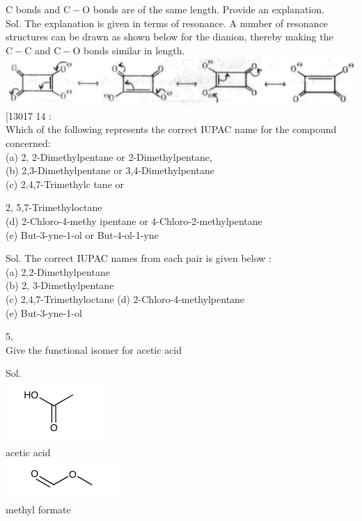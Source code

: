 \documentclass[10pt]{article}
\begin{document}
C bonds and $\mathrm{C}-\mathrm{O}$ bonds are of the same length. Provide an explanation.\\
Sol. The explanation is given in terms of resonance. A number of resonance structures can be drawn as shown below for the dianion, thereby making the $\mathrm{C}-\mathrm{C}$ and $\mathrm{C}-\mathrm{O}$ bonds similar in length.\\
\includegraphics[max width=\textwidth, center]{2025_01_28_8470952b98110cec3aabg-119(2)}\\[0pt]
[13017 14 :\\
Which of the following represents the correct IUPAC name for the compound concerned:\\
(a) 2, 2-Dimethylpentane or 2-Dimethylpentane,\\
(b) 2,3-Dimethylpentane or 3,4-Dimethylpentane\\
(c) 2,4,7-Trimethylc tane or

2, 5,7-Trimethyloctane\\
(d) 2-Chloro-4-methy ipentane or 4-Chloro-2-methylpentane\\
(e) But-3-yne-1-ol or But-4-ol-1-yne

Sol. The correct IUPAC names from each pair is given below :\\
(a) 2,2-Dimethylpentane\\
(b) 2, 3-Dimethylpentane\\
(c) 2,4,7-Trimethyloctane (d) 2-Chloro-4-methylpentane\\
(e) But-3-yne-1-ol

5,\\
Give the functional isomer for acetic acid

Sol.\\
\includegraphics{smile-77d08622e1f194b603706b0138d0873dd084322b}\\
acetic acid\\
\includegraphics{smile-6d9ee3e0ea546a983af1eb590cef80bedcb7bf83}\\
methyl formate
\end{document}
